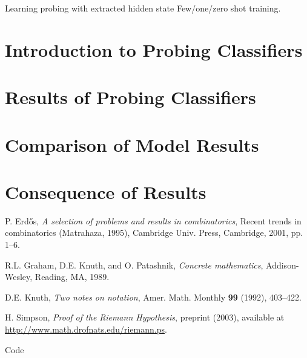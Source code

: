 \documentclass[11pt,a4paper,twoside,openright]{scrbook}
\begin{document}
Learning probing with extracted hidden state
Few/one/zero shot training.
\chapter{Introduction to Probing Classifiers}


\chapter{Results of Probing Classifiers}
\chapter{Comparison of Model Results}
\chapter{Consequence of Results}





\begin{thebibliography}{9}
 P. Erd\H os, \emph{A selection of problems and
results in combinatorics}, Recent trends in combinatorics (Matrahaza,
1995), Cambridge Univ. Press, Cambridge, 2001, pp. 1--6.

R.L. Graham, D.E. Knuth, and O. Patashnik, \emph{Concrete
mathematics}, Addison-Wesley, Reading, MA, 1989.

 D.E. Knuth, \emph{Two notes on notation}, Amer.
Math. Monthly \textbf{99} (1992), 403--422.

 H. Simpson, \emph{Proof of the Riemann
Hypothesis},  preprint (2003), available at
\url{http://www.math.drofnats.edu/riemann.ps}.
\end{thebibliography}
\newpage

\listoffigures
\newpage

\listoftables
\newpage

Code
\end{document}
